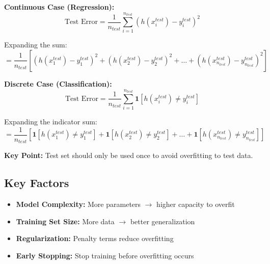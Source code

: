 \documentclass{article}
\begin{document}
\textbf{Continuous Case (Regression):}
\[
\text{Test Error} = \frac{1}{n_{test}}\sum_{i=1}^{n_{test}} (h(x_i^{test}) - y_i^{test})^2
\]

Expanding the sum:
\[
= \frac{1}{n_{test}}\left[ (h(x_1^{test}) - y_1^{test})^2 + (h(x_2^{test}) - y_2^{test})^2 + \ldots + (h(x_{n_{test}}^{test}) - y_{n_{test}}^{test})^2 \right]
\]

\textbf{Discrete Case (Classification):}
\[
\text{Test Error} = \frac{1}{n_{test}}\sum_{i=1}^{n_{test}} \mathbf{1}[h(x_i^{test}) \neq y_i^{test}]
\]

Expanding the indicator sum:
\[
= \frac{1}{n_{test}}\left[ \mathbf{1}[h(x_1^{test}) \neq y_1^{test}] + \mathbf{1}[h(x_2^{test}) \neq y_2^{test}] + \ldots + \mathbf{1}[h(x_{n_{test}}^{test}) \neq y_{n_{test}}^{test}] \right]
\]

\textbf{Key Point:} Test set should only be used once to avoid overfitting to test data.

\subsection{Key Factors}
\begin{itemize}
    \item \textbf{Model Complexity:} More parameters $\rightarrow$ higher capacity to overfit
    \item \textbf{Training Set Size:} More data $\rightarrow$ better generalization
    \item \textbf{Regularization:} Penalty terms reduce overfitting
    \item \textbf{Early Stopping:} Stop training before overfitting occurs
\end{itemize}
\end{document}
